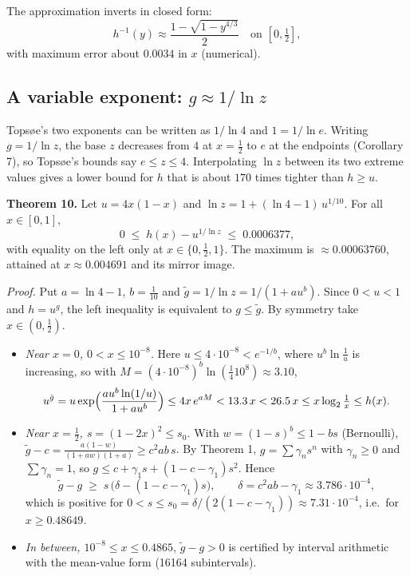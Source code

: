 \documentclass[
  11pt,
]{article}
\providecommand{\tightlist}{%
  \setlength{\itemsep}{0pt}\setlength{\parskip}{0pt}}
\begin{document}
The approximation inverts in closed form: \[
h^{-1}(y) \approx \frac{1 - \sqrt{1 - y^{4/3}}}{2} \quad\text{on } [0, \tfrac12],
\] with maximum error about \(0.0034\) in \(x\) (numerical).

\hypertarget{a-variable-exponent-g-approx-1ln-z}{%
\subsection{\texorpdfstring{A variable exponent:
\(g \approx 1/\ln z\)}{A variable exponent: g \textbackslash approx 1/\textbackslash ln z}}\label{a-variable-exponent-g-approx-1ln-z}}

Topsøe's two exponents can be written as \(1/\ln 4\) and
\(1 = 1/\ln e\). Writing \(g = 1/\ln z\), the base \(z\) decreases from
\(4\) at \(x = \tfrac12\) to \(e\) at the endpoints (Corollary 7), so
Topsøe's bounds say \(e \le z \le 4\). Interpolating \(\ln z\) between
its two extreme values gives a lower bound for \(h\) that is about
\(170\) times tighter than \(h \ge u\).

\textbf{Theorem 10.} Let \(u = 4x(1-x)\) and
\(\ln z = 1 + (\ln 4 - 1)\,u^{1/10}\). For all \(x \in [0,1]\), \[
0 \;\le\; h(x) - u^{1/\ln z} \;\le\; 0.0006377,
\] with equality on the left only at \(x \in \{0, \tfrac12, 1\}\). The
maximum is \(\approx 0.00063760\), attained at \(x \approx 0.004691\)
and its mirror image.

\emph{Proof.} Put \(a = \ln 4 - 1\), \(b = \tfrac1{10}\) and
\(\tilde g = 1/\ln z = 1/(1 + a u^b)\). Since \(0 < u < 1\) and
\(h = u^g\), the left inequality is equivalent to \(g \le \tilde g\). By
symmetry take \(x \in (0, \tfrac12)\).

\begin{itemize}
\tightlist
\item
  \emph{Near \(x = 0\), \(0 < x \le 10^{-8}\).} Here
  \(u \le 4\cdot 10^{-8} < e^{-1/b}\), where \(u^b \ln\frac1u\) is
  increasing, so with
  \(M = (4\cdot10^{-8})^b \ln(\frac{1}{4}10^{8}) \approx 3.10\), \[
  u^{\tilde g} = u \exp\Bigl(\frac{a u^b \ln(1/u)}{1 + a u^b}\Bigr) \le 4x\,e^{aM} < 13.3\,x < 26.5\,x \le x \log_2\tfrac{1}{x} \le h(x).
  \]
\item
  \emph{Near \(x = \tfrac12\), \(s = (1-2x)^2 \le s_0\).} With
  \(w = (1-s)^b \le 1 - bs\) (Bernoulli),
  \(\tilde g - c = \frac{a(1-w)}{(1+aw)(1+a)} \ge c^2 ab\, s\). By
  Theorem 1, \(g = \sum \gamma_n s^n\) with \(\gamma_n \ge 0\) and
  \(\sum \gamma_n = 1\), so
  \(g \le c + \gamma_1 s + (1 - c - \gamma_1) s^2\). Hence \[
  \tilde g - g \;\ge\; s\,\bigl(\delta - (1 - c - \gamma_1)s\bigr), \qquad \delta = c^2 a b - \gamma_1 \approx 3.786\cdot 10^{-4},
  \] which is positive for
  \(0 < s \le s_0 = \delta / (2(1 - c - \gamma_1)) \approx 7.31\cdot 10^{-4}\),
  i.e.~for \(x \ge 0.48649\).
\item
  \emph{In between, \(10^{-8} \le x \le 0.4865\)}, \(\tilde g - g > 0\)
  is certified by interval arithmetic with the mean-value form (16164
  subintervals).
\end{itemize}
\end{document}
